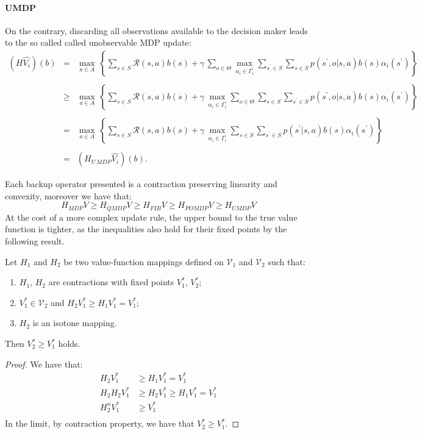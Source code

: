 \paragraph{UMDP} On the contrary, discarding all observations available to
the decision maker leads to the so called called unobservable MDP update:
\[
\begin{array}{rcl}
(H\widehat{V_i})(b)&=&\displaystyle
\max_{a\in A}\,\left\{\sum_{s\in S}\mathcal{R}(s,a)b(s)+\gamma\,
\sum_{o\in\Theta}\max_{\alpha_i\in\Gamma_i^{\prime}}
\sum_{s^{\prime}\in S}\sum_{s\in S}p(s^{\prime},o|s,a)b(s)\alpha_i(s^{\prime})\right\}\\
\\
&\geq&\displaystyle
\max_{a\in A}\,\left\{\sum_{s\in S}\mathcal{R}(s,a)b(s)+\gamma\,
\max_{\alpha_i\in\Gamma_i^{\prime}}
\sum_{o\in\Theta}\sum_{s\in S}\sum_{s^{\prime}\in S}p(s^{\prime},o|s,a)b(s)\alpha_i(s^{\prime})\right\}\\
\\
&=&\displaystyle
\max_{a\in A}\,\left\{\sum_{s\in S}\mathcal{R}(s,a)b(s)+\gamma\,
\max_{\alpha_i\in\Gamma_i^{\prime}}
\sum_{s\in S}\sum_{s^{\prime}\in S}p(s^{\prime}|s,a)b(s)\alpha_i(s^{\prime})\right\}\\
\\
&=&\displaystyle
\left(H_{U\,MDP}\widehat{V_i}\right)(b).
\end{array}
\]

Each backup operator presented is a contraction preserving linearity and convexity, moreover 
we have that:
$$H_{MDP}V \geq H_{QMDP}V \geq H_{FIB}V \geq H_{POMDP}V \geq H_{UMDP}V$$
At the cost of a more complex update rule, the upper bound to the true value function is tighter, as 
the inequalities also hold for their fixed points by the following result.

\begin{theorem}
    Let $H_1$ and $H_2$ be two value-function mappings defined on $\mathcal{V}_1$ and $\mathcal{V}_2$ such that:
    \begin{enumerate}
        \item $H_1$, $H_2$ are contractions with fixed points $V_1^*$, $V_2^*$;
        \item $V_1^* \in \mathcal{V}_2$ and $H_2 V_1^* \geq H_1 V_1^* = V_1^*$;
        \item $H_2$ is an isotone mapping.
    \end{enumerate}
    Then $V_2^* \geq V_1^*$ holds.
\end{theorem}
\begin{proof}
    We have that:
    \begin{align*}
        H_2 V_1^* &\geq H_1 V_1^* = V_1^* \\
        H_2 H_2 V_1^* &\geq H_2 V_1^* \geq H_1 V_1^* = V_1^* \\
        H_2^n V_1^* &\geq V_1^* \\
    \end{align*}
    In the limit, by contraction property, we have that $V_2^* \geq V_1^*$.
\end{proof}

